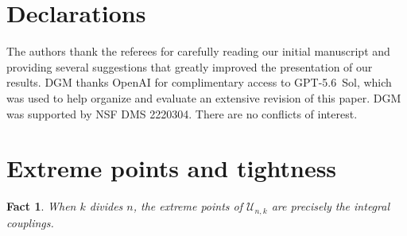 \documentclass{article}
\theoremstyle{plain}
\newtheorem{fact}{Fact}
\theoremstyle{definition}
\newcommand{\1}{\mathbf{1}}
\newcommand{\bUnk}{\mathcal{U}_{n,k}}
\newcommand{\bmF}{\bm{F}}
\newcommand{\bmu}{\bm{\mu}}
\begin{document}



\section*{Declarations}

The authors thank the referees for carefully reading our initial manuscript and providing several suggestions that greatly improved the presentation of our results.
DGM thanks OpenAI for complimentary access to GPT-5.6~Sol, which was used to help organize and evaluate an extensive revision of this paper.
DGM was supported by NSF DMS 2220304. 
There are no conflicts of interest.

\appendix

\section{Extreme points and tightness}
\label{sec:appendix}

\begin{fact}
\label{fact:extreme points of Unk}
When $k$ divides $n$, the extreme points of $\bUnk$ are precisely the integral couplings.
\end{fact}
\end{document}
